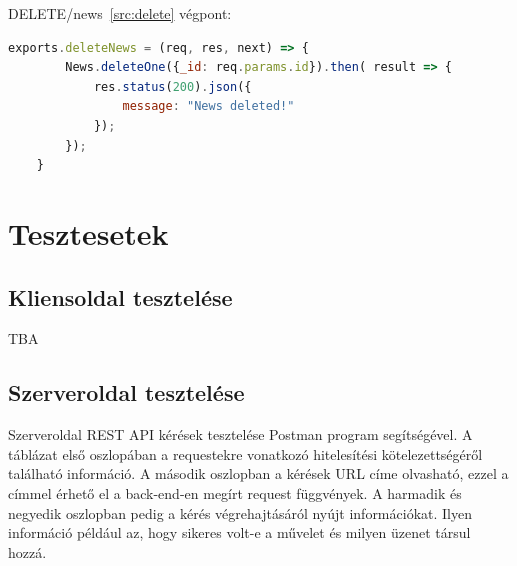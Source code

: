 DELETE/news~\ref{src:delete} végpont:

\begin{lstlisting}[language=JavaScript]
	exports.deleteNews = (req, res, next) => {
		News.deleteOne({_id: req.params.id}).then( result => {
			res.status(200).json({
				message: "News deleted!"
			});
		});
	}
\end{lstlisting}

\section{Tesztesetek}

\subsection{Kliensoldal tesztelése}
TBA


\subsection{Szerveroldal tesztelése}
Szerveroldal REST API kérések tesztelése Postman program segítségével. A táblázat első oszlopában a requestekre vonatkozó hitelesítési kötelezettségéről található információ. A második oszlopban a kérések URL címe olvasható, ezzel a címmel érhető el a back-end-en megírt request függvények.  A harmadik és negyedik oszlopban pedig a kérés végrehajtásáról nyújt információkat. Ilyen információ például az, hogy sikeres volt-e a művelet és milyen üzenet társul hozzá.

